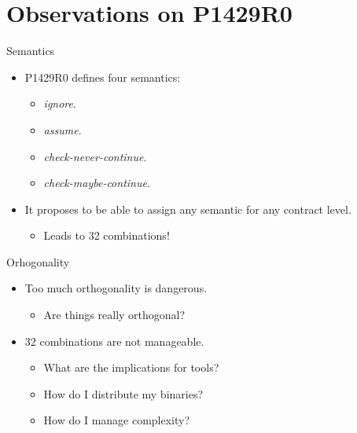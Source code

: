 \section{Observations on P1429R0}

\begin{frame}[t]{Semantics}
\begin{itemize}
  \item P1429R0 defines four semantics:
  \begin{itemize}
    \item \emph{ignore}.
    \item \emph{assume}.
    \item \emph{check-never-continue}.
    \item \emph{check-maybe-continue}. 
  \end{itemize}
  \vfill
  \item It proposes to be able to assign any semantic for any contract level.
    \begin{itemize}
      \item Leads to 32 combinations!
    \end{itemize}
\end{itemize}
\end{frame}

\begin{frame}[t]{Orhogonality}
\begin{itemize}
  \item Too much orthogonality is dangerous.
    \begin{itemize}
      \item Are things really orthogonal?
    \end{itemize}
  \vfill
  \item 32 combinations are not manageable.
    \begin{itemize}
      \item What are the implications for tools?
      \item How do I distribute my binaries?
      \item How do I manage complexity?
    \end{itemize}
\end{itemize}
\end{frame}

